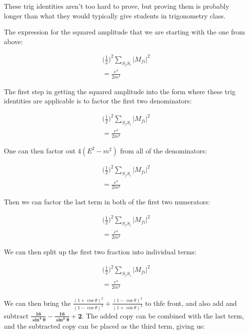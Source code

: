 \documentclass[a4]{article}
\begin{document}
    These trig identities aren't too hard to prove, but proving them is probably longer than what they would typically give students in trigonometry class.

    The expression for the squared amplitude that we are starting with the one from above:

    \begin{eqnarray}
        \bigg( \frac{1}{2} \bigg)^2 \sum_{S_f S_i} |M_{f i}|^2 \\
        = \frac{e^4}{2 m^4}
    \end{eqnarray}

    The first step in getting the squared amplitude into the form where these trig identities are applicable is to factor the first two denominators:

    \begin{eqnarray}
        \bigg( \frac{1}{2} \bigg)^2 \sum_{S_f S_i} |M_{f i}|^2 \\
        = \frac{e^4}{2 m^4}
    \end{eqnarray}

    One can then factor out $4 (E^2 - m^2)$ from all of the denominators:

    \begin{eqnarray}
        \bigg( \frac{1}{2} \bigg)^2 \sum_{S_f S_i} |M_{f i}|^2 \\
        = \frac{e^4}{2 m^4}
    \end{eqnarray}

    Then we can factor the last term in both of the first two numerators:

    \begin{eqnarray}
        \bigg( \frac{1}{2} \bigg)^2 \sum_{S_f S_i} |M_{f i}|^2 \\
        = \frac{e^4}{2 m^4}
    \end{eqnarray}

    We can then split up the first two fraction into individual terms:

    \begin{eqnarray}
        \bigg( \frac{1}{2} \bigg)^2 \sum_{S_f S_i} |M_{f i}|^2 \\
        = \frac{e^4}{2 m^4}
    \end{eqnarray}

    We can then bring the $\frac{(1 + \cos \theta)^2}{(1 - \cos \theta)^2} + \frac{(1 - \cos \theta)^2}{(1 + \cos \theta)^2}$ to thfe front, and also add and subtract $\mathbf{\frac{16}{\sin^4 \theta} - \frac{16}{\sin^2 \theta} + 2}$. The added
    copy can be combined with the last term, and the subtracted copy can be placed as the third term, giving us:
\end{document}
